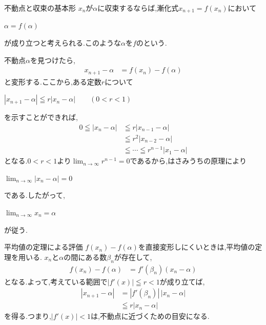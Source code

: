\documentclass[10pt,fleqn,a4paper]{jsarticle}
\begin{document}
\begin{itembox}
[l]{\enpitu 不動点と収束の基本形}
$x_n$が$\alpha$に収束するならば,漸化式$x_{n+1}=f(x_n)$において
\begin{center}
$\alpha=f(\alpha)$
\end{center}
が成り立つと考えられる.このような$\alpha$を$f$のという.

不動点$\alpha$を見つけたら,
\begin{align*}
x_{n+1}-\alpha
&=f(x_n)-f(\alpha)
\end{align*}
と変形する.ここから,ある定数$r$について
\begin{center}
$|x_{n+1}-\alpha|\leqq r|x_n-\alpha|\qquad(0<r<1)$
\end{center}
を示すことができれば,
\begin{align*}
0\leqq|x_n-\alpha|
&\leqq r|x_{n-1}-\alpha|\\
&\leqq r^2|x_{n-2}-\alpha|\\
&\leqq\cdots\leqq r^{n-1}|x_1-\alpha|
\end{align*}
となる.$0<r<1$より$\displaystyle\lim_{n\to\infty}r^{n-1}=0$であるから,はさみうちの原理により
\begin{center}
$\displaystyle\lim_{n\to\infty}|x_n-\alpha|=0$
\end{center}
である.したがって,
\begin{center}
$\displaystyle\lim_{n\to\infty}x_n=\alpha$
\end{center}
が従う.
\end{itembox}

\begin{itembox}
[l]{\enpitu 平均値の定理による評価}
$f(x_n)-f(\alpha)$を直接変形しにくいときは,平均値の定理を用いる.
$x_n$と$\alpha$の間にある数$\beta_n$が存在して,
\begin{align*}
f(x_n)-f(\alpha)&=f'(\beta_n)(x_n-\alpha)
\end{align*}
となる.よって,考えている範囲で$|f'(x)|\leqq r<1$が成り立てば,
\begin{align*}
|x_{n+1}-\alpha|
&=|f'(\beta_n)|\,|x_n-\alpha|\\
&\leqq r|x_n-\alpha|
\end{align*}
を得る.つまり,$|f'(x)|<1$は,不動点に近づくための目安になる.
\end{itembox}

\newpage
\end{document}
